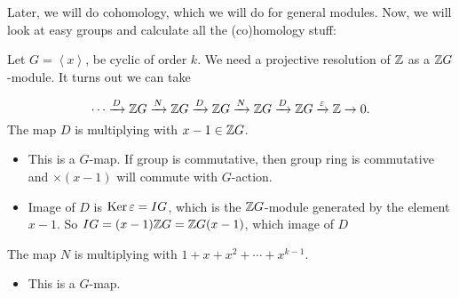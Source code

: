 Later, we will do cohomology, which we will do for general modules.
Now, we will look at easy groups and calculate all the (co)homology stuff:


Let $G = \left<x \right>$, be cyclic of order $k$.
We need a projective resolution of  $\mathbb{Z}$ as a $\mathbb{Z} G$-module. It turns out we can take

\[
    \cdots \xrightarrow{D}  \mathbb{Z} G \xrightarrow{N} \mathbb{Z} G
    \xrightarrow{D}  \mathbb{Z} G \xrightarrow{N} \mathbb{Z} G
    \xrightarrow{D}  \mathbb{Z} G \xrightarrow{\varepsilon} \mathbb{Z} \to  0
.\] 
The map $D$ is multiplying with  $x -1 \in \mathbb{Z} G$.
\begin{itemize}
    \item This is a $G$-map. If group is commutative, then group ring is commutative and $\times (x-1)$ will commute with $G$-action.
    \item Image of $D$ is $\operatorname{Ker} \varepsilon = IG$, which is the $\mathbb{Z} G$-module generated by the element $x-1$. 
        So $IG = (x-1) \mathbb{Z} G = \mathbb{Z} G( x-1)$, which image of $D$
\end{itemize}

The map $N$ is multiplying with  $1 + x + x^2 + \cdots  + x^{k-1}$.
\begin{itemize}
    \item This is a $G$-map.
\end{itemize}

